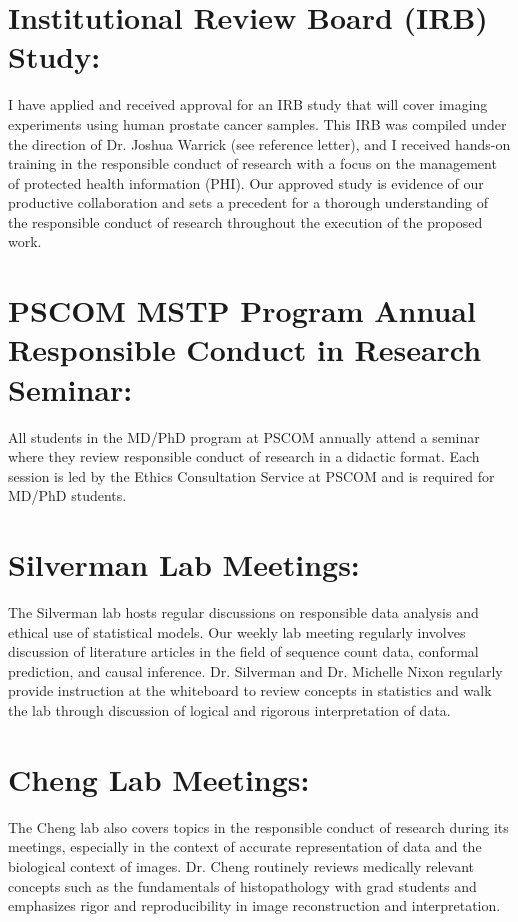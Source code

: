 \documentclass{NIHGrant}
\begin{document}
\section*{Institutional Review Board (IRB) Study:}
I have applied and received approval for an IRB study that will cover imaging experiments using human prostate cancer samples. This IRB was compiled under the direction of Dr. Joshua Warrick (see reference letter), and I received hands-on training in the responsible conduct of research with a focus on the management of protected health information (PHI). Our approved study is evidence of our productive collaboration and sets a precedent for a thorough understanding of the responsible conduct of research throughout the execution of the proposed work.

\section*{PSCOM MSTP Program Annual Responsible Conduct in Research Seminar:}
All students in the MD/PhD program at PSCOM annually attend a seminar where they review responsible conduct of research in a didactic format. Each session is led by the Ethics Consultation Service at PSCOM and is required for MD/PhD students.

\section*{Silverman Lab Meetings:}
The Silverman lab hosts regular discussions on responsible data analysis and ethical use of statistical models. Our weekly lab meeting regularly involves discussion of literature articles in the field of sequence count data, conformal prediction, and causal inference. Dr. Silverman and Dr. Michelle Nixon regularly provide instruction at the whiteboard to review concepts in statistics and walk the lab through discussion of logical and rigorous interpretation of data.

\section*{Cheng Lab Meetings:}
The Cheng lab also covers topics in the responsible conduct of research during its meetings, especially in the context of accurate representation of data and the biological context of images. Dr. Cheng routinely reviews medically relevant concepts such as the fundamentals of histopathology with grad students and emphasizes rigor and reproducibility in image reconstruction and interpretation.

\end{document}
